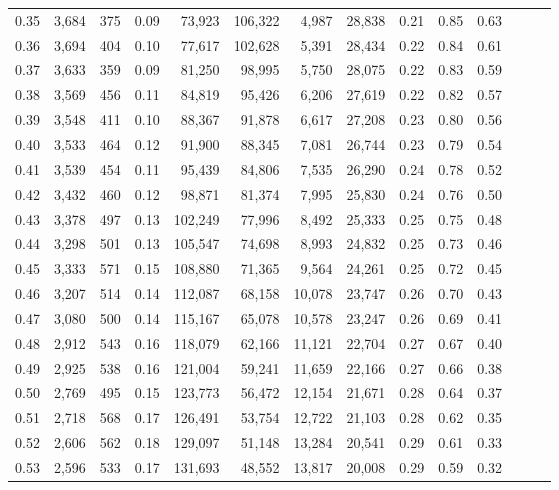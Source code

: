 \begin{tabular}{rrrrrrrrrrrrrr}
0.35 &  3,684 &  375 &  0.09 &   73,923 &  106,322 &   4,987 &  28,838 &  0.21 &  0.85 &      0.63 \\
0.36 &  3,694 &  404 &  0.10 &   77,617 &  102,628 &   5,391 &  28,434 &  0.22 &  0.84 &      0.61 \\
0.37 &  3,633 &  359 &  0.09 &   81,250 &   98,995 &   5,750 &  28,075 &  0.22 &  0.83 &      0.59 \\
0.38 &  3,569 &  456 &  0.11 &   84,819 &   95,426 &   6,206 &  27,619 &  0.22 &  0.82 &      0.57 \\
0.39 &  3,548 &  411 &  0.10 &   88,367 &   91,878 &   6,617 &  27,208 &  0.23 &  0.80 &      0.56 \\
0.40 &  3,533 &  464 &  0.12 &   91,900 &   88,345 &   7,081 &  26,744 &  0.23 &  0.79 &      0.54 \\
0.41 &  3,539 &  454 &  0.11 &   95,439 &   84,806 &   7,535 &  26,290 &  0.24 &  0.78 &      0.52 \\
0.42 &  3,432 &  460 &  0.12 &   98,871 &   81,374 &   7,995 &  25,830 &  0.24 &  0.76 &      0.50 \\
0.43 &  3,378 &  497 &  0.13 &  102,249 &   77,996 &   8,492 &  25,333 &  0.25 &  0.75 &      0.48 \\
0.44 &  3,298 &  501 &  0.13 &  105,547 &   74,698 &   8,993 &  24,832 &  0.25 &  0.73 &      0.46 \\
0.45 &  3,333 &  571 &  0.15 &  108,880 &   71,365 &   9,564 &  24,261 &  0.25 &  0.72 &      0.45 \\
0.46 &  3,207 &  514 &  0.14 &  112,087 &   68,158 &  10,078 &  23,747 &  0.26 &  0.70 &      0.43 \\
0.47 &  3,080 &  500 &  0.14 &  115,167 &   65,078 &  10,578 &  23,247 &  0.26 &  0.69 &      0.41 \\
0.48 &  2,912 &  543 &  0.16 &  118,079 &   62,166 &  11,121 &  22,704 &  0.27 &  0.67 &      0.40 \\
0.49 &  2,925 &  538 &  0.16 &  121,004 &   59,241 &  11,659 &  22,166 &  0.27 &  0.66 &      0.38 \\
0.50 &  2,769 &  495 &  0.15 &  123,773 &   56,472 &  12,154 &  21,671 &  0.28 &  0.64 &      0.37 \\
0.51 &  2,718 &  568 &  0.17 &  126,491 &   53,754 &  12,722 &  21,103 &  0.28 &  0.62 &      0.35 \\
0.52 &  2,606 &  562 &  0.18 &  129,097 &   51,148 &  13,284 &  20,541 &  0.29 &  0.61 &      0.33 \\
0.53 &  2,596 &  533 &  0.17 &  131,693 &   48,552 &  13,817 &  20,008 &  0.29 &  0.59 &      0.32 \\

\end{tabular}
